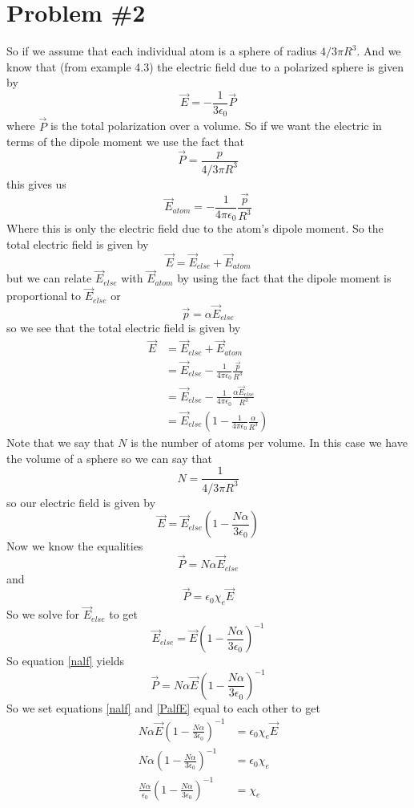 \documentclass[11pt]{article}
\numberwithin{equation}{section}
\newcommand{\vecE}{\vec{E}}
\newcommand{\vecP}{\vec{P}}
\begin{document}
\section{Problem \#2}
So if we assume that each individual atom is a sphere of radius $4/3\pi R^3$. And we know that (from example 4.3) the electric field due to a polarized sphere is given by
$$\vecE = -\frac{1}{3\epsilon_0}\vecP$$
where $\vecP$ is the total polarization over a volume. So if we want the electric in terms of the dipole moment we use the fact that $$\vecP=\frac{p}{4/3\pi R^3}$$ this gives us
$$\vecE_{atom} = -\frac{1}{4\pi\epsilon_0}\frac{\vec{p}}{R^3}$$
Where this is only the electric field due to the atom's dipole moment. So the total electric field is given by
$$\vecE = \vecE_{else}+\vecE_{atom}$$
but we can relate $\vecE_{else}$ with $\vecE_{atom}$ by using the fact that the dipole moment is proportional to $\vecE_{else}$ or
$$\vec{p} = \alpha \vecE_{else}$$
so we see that the total electric field is given by
\begin{align*}
\vecE &= \vecE_{else}+\vecE_{atom}\\
&= \vecE_{else}-\frac{1}{4\pi\epsilon_0}\frac{\vec{p}}{R^3}\\
&= \vecE_{else}-\frac{1}{4\pi\epsilon_0}\frac{\alpha\vecE_{else}}{R^3}\\
&= \vecE_{else}\left(1-\frac{1}{4\pi\epsilon_0}\frac{\alpha}{R^3}\right)
\end{align*}
Note that we say that $N$ is the number of atoms per volume. In this case we have the volume of a sphere so we can say that
$$N=\frac{1}{4/3\pi R^3}$$
so our electric field is given by
$$\vecE= \vecE_{else}\left(1-\frac{N\alpha}{3\epsilon_0}\right)$$
Now we know the equalities
\begin{equation}
\vecP = N\alpha\vecE_{else}
\label{nalf}
\end{equation}
and
\begin{equation}
\vecP = \epsilon_0\chi_e\vecE
\label{PalfE}
\end{equation}
So we solve for $\vecE_{else}$ to get
$$\vecE_{else} =\vecE\left(1-\frac{N\alpha}{3\epsilon_0}\right)^{-1}$$
So equation \ref{nalf} yields
$$\vecP = N\alpha\vecE\left(1-\frac{N\alpha}{3\epsilon_0}\right)^{-1}$$
So we set equations \ref{nalf} and \ref{PalfE} equal to each other to get
\begin{align*}
N\alpha\vecE\left(1-\frac{N\alpha}{3\epsilon_0}\right)^{-1} &= \epsilon_0\chi_e\vecE\\
N\alpha\left(1-\frac{N\alpha}{3\epsilon_0}\right)^{-1} &= \epsilon_0\chi_e\\
\frac{N\alpha}{\epsilon_0}\left(1-\frac{N\alpha}{3\epsilon_0}\right)^{-1} &= \chi_e
\end{align*}
\end{document}
